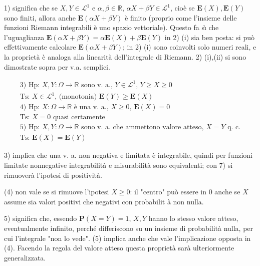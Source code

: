 \documentclass{article}
\begin{document}
1) significa che se $X,Y\in \mathcal{L}^{1}$ e $\alpha ,\beta \in 
\mathbb{R}
$, $\alpha X+\beta Y\in \mathcal{L}^{1}$, cio\`{e} se $\mathbf{E}\left(
X\right) ,\mathbf{E}\left( Y\right) $ sono finiti, allora anche $\mathbf{E}%
\left( \alpha X+\beta Y\right) $ \`{e} finito (proprio come l'insieme delle
funzioni Riemann integrabili \`{e} uno spazio vettoriale). Questo fa s\`{\i}
che l'uguaglianza $\mathbf{E}\left( \alpha X+\beta Y\right) =\alpha \mathbf{E%
}\left( X\right) +\beta \mathbf{E}\left( Y\right) $ in 2) (i) sia ben posta:
si pu\`{o} effettivamente calcolare $\mathbf{E}\left( \alpha X+\beta
Y\right) $; in 2) (i) sono coinvolti solo numeri reali, e la propriet\`{a} 
\`{e} analoga alla linearit\`{a} dell'integrale di Riemann. 2) (i),(ii) si
sono dimostrate sopra per v.a. semplici.

\begin{gather*}
\text{3) Hp: }X,Y:\Omega \rightarrow 
\mathbb{R}
\text{ sono v. a., }Y\in \mathcal{L}^{1}\text{, }Y\geq X\geq 0 \\
\text{Ts: }X\in \mathcal{L}^{1}\text{, (monotonia) }\mathbf{E}\left(
Y\right) \geq \mathbf{E}\left( X\right) \\
\text{4) Hp: }X:\Omega \rightarrow 
\mathbb{R}
\text{ \`{e} una v. a., }X\geq 0\text{, }\mathbf{E}\left( X\right) =0 \\
\text{Ts: }X=0\text{ quasi certamente} \\
\text{5) Hp: }X,Y:\Omega \rightarrow 
\mathbb{R}
\text{ sono v. a. che ammettono valore atteso, }X=Y\text{ q. c.} \\
\text{Ts: }\mathbf{E}\left( X\right) =\mathbf{E}\left( Y\right)
\end{gather*}

3) implica che una v. a. non negativa e limitata \`{e}
integrabile, quindi per funzioni limitate nonnegative integrabilit\`{a} e
misurabilit\`{a} sono equivalenti; con 7) si rimuover\`{a} l'ipotesi di
positivit\`{a}.

(4) non vale se si rimuove l'ipotesi $X\geq 0$: il "centro" pu\`{o} essere
in $0$ anche se $X$ assume sia valori positivi che negativi con probabilit%
\`{a} non nulla.

5) significa che, essendo $\mathbf{P}\left( X=Y\right) =1$, $X,Y$ hanno lo
stesso valore atteso, eventualmente infinito, perch\'{e} differiscono su un
insieme di probabilit\`{a} nulla, per cui l'integrale "non lo vede". (5)
implica anche che vale l'implicazione opposta in (4). Facendo la regola del
valore atteso questa propriet\`{a} sar\`{a} ulteriormente generalizzata.
\end{document}

